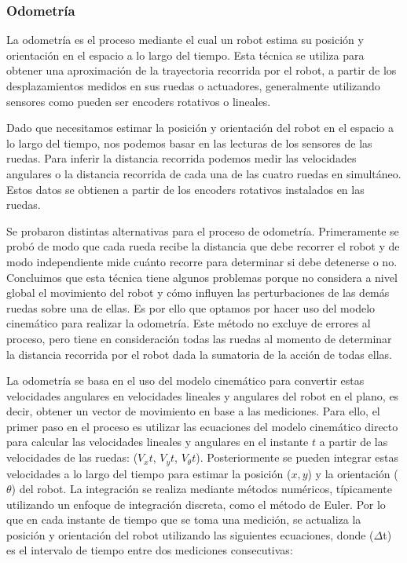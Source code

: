 \subsubsection{Odometría}

La odometría es el proceso mediante el cual un robot estima su posición y orientación en el espacio a lo largo del tiempo. Esta técnica se utiliza para obtener una aproximación de la trayectoria recorrida por el robot, a partir de los desplazamientos medidos en sus ruedas o actuadores, generalmente utilizando sensores como pueden ser encoders rotativos o lineales.

Dado que necesitamos estimar la posición y orientación del robot en el espacio a lo largo del tiempo, nos podemos basar en las lecturas de los sensores de las ruedas. Para inferir la distancia recorrida podemos medir las velocidades angulares o la distancia recorrida de cada una de las cuatro ruedas en simultáneo. Estos datos se obtienen a partir de los encoders rotativos instalados en las ruedas.

Se probaron distintas alternativas para el proceso de odometría. Primeramente se probó de modo que cada rueda recibe la distancia que debe recorrer el robot y de modo independiente mide cuánto recorre para determinar si debe detenerse o no. Concluimos que esta técnica tiene algunos problemas porque no considera a nivel global el movimiento del robot y cómo influyen las perturbaciones de las demás ruedas sobre una de ellas. Es por ello que optamos por hacer uso del modelo cinemático para realizar la odometría. Este método no excluye de errores al proceso, pero tiene en consideración todas las ruedas al momento de determinar la distancia recorrida por el robot dada la sumatoria de la acción de todas ellas. \cite{palacinodometry}

La odometría se basa en el uso del modelo cinemático para convertir estas velocidades angulares en velocidades lineales y angulares del robot en el plano, es decir, obtener un vector de movimiento en base a las mediciones. Para ello, el primer paso en el proceso es utilizar las ecuaciones del modelo cinemático directo para calcular las velocidades lineales y angulares en el instante $t$ a partir de las velocidades de las ruedas: ($V_xt$, $V_yt$, $V_\theta t$). Posteriormente se pueden integrar estas velocidades a lo largo del tiempo para estimar la posición ($x, y$) y la orientación ($\theta$) del robot. La integración se realiza mediante métodos numéricos, típicamente utilizando un enfoque de integración discreta, como el método de Euler. Por lo que en cada instante de tiempo que se toma una medición, se actualiza la posición y orientación del robot utilizando las siguientes ecuaciones, donde ($\Delta$t) es el intervalo de tiempo entre dos mediciones consecutivas:

